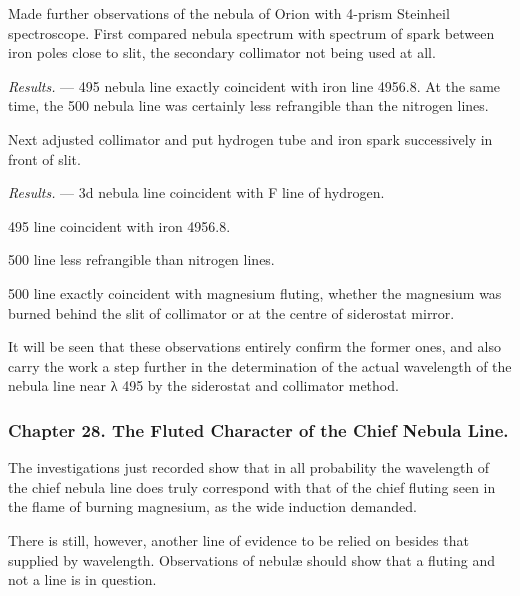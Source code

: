 \documentclass[a4paper, 12pt, oneside, polutonikogreek, english]{article}
\begin{document}
Made further observations of the nebula of Orion with 4-prism Steinheil spectroscope. First compared nebula spectrum with spectrum of spark between iron poles close to slit, the secondary collimator not being used at all.

\emph{Results.} --- 495 nebula line exactly coincident with iron line 4956.8. At the same time, the 500 nebula line was certainly less refrangible than the nitrogen lines.

Next adjusted collimator and put hydrogen tube and iron spark successively in front of slit.

\emph{Results.} --- 3d nebula line coincident with F line of hydrogen.

495 line coincident with iron 4956.8.

500 line less refrangible than nitrogen lines.

500 line exactly coincident with magnesium fluting, whether the magnesium was burned behind the slit of collimator or at the centre of siderostat mirror.

It will be seen that these observations entirely confirm the former ones, and also carry the work a step further in the determination of the actual wavelength of the nebula line near λ 495 by the siderostat and collimator method.

\subsubsection{Chapter 28. The Fluted Character of the Chief Nebula Line.}

The investigations just recorded show that in all probability the wavelength of the chief nebula line does truly correspond with that of the chief fluting seen in the flame of burning magnesium, as the wide induction demanded.

There is still, however, another line of evidence to be relied on besides that supplied by wavelength. Observations of nebulæ should show that a fluting and not a line is in question.
\end{document}
